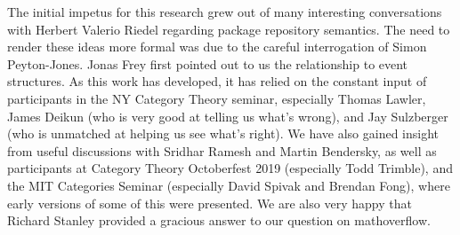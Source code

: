 \documentclass[hoptionsi,review,screen,format=sigconf]{acmart}
\theoremstyle{definition}
\begin{document}




%






\begin{acks}
The initial impetus for this research grew out of many interesting conversations with Herbert Valerio Riedel regarding package repository semantics. The need to render these ideas more formal was due to the careful interrogation of Simon Peyton-Jones. Jonas Frey first pointed out to us the relationship to event structures. As this work has developed, it has relied on the constant input of participants in the NY Category Theory seminar, especially Thomas Lawler, James Deikun (who is very good at telling us what's wrong), and Jay Sulzberger (who is unmatched at helping us see what's right). We have also gained insight from useful discussions with Sridhar Ramesh and Martin Bendersky, as well as participants at Category Theory Octoberfest 2019 (especially Todd Trimble), and the MIT Categories Seminar (especially David Spivak and Brendan Fong), where early versions of some of this were presented. We are also very happy that Richard Stanley provided a gracious answer to our question on mathoverflow.
\end{acks}


\newpage
 \nocite{*}
%  
 
\end{document}
